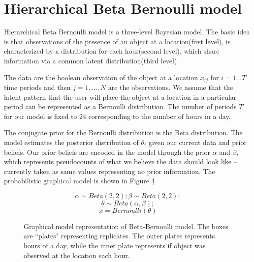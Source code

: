 \section{Hierarchical Beta Bernoulli model}


Hierarchical Beta Bernoulli model is a three-level Bayesian model. The basic idea is that observations of the presence of an object at a location(first level), is characterized by a distribution for each hour(second level), which share information via a common latent distribution(third level).

The data are the boolean observation of the object at a location $x_{ij}$ for $i = 1 \dots T$ time periods and then $j = 1, \dots , N$  are the observations.  We assume that the latent pattern that the user will place the object at a  location in a particular period can be represented as a Bernoulli distribution. The number of periods $T$ for our model is fixed to 24 corresponding to the number of hours in a day. 

The conjugate prior for the Bernoulli distribution is the Beta distribution. The model estimates the posterior distribution of $\theta_i$ given our current data and prior beliefs. Our prior beliefs are encoded in the model through the prior $\alpha$ and $\beta$, which represents pseudocounts of what we believe the data should look like – currently taken as same values representing no prior information. The probabilistic graphical model is shown in Figure \ref{bbm}

\noindent
\begin{figure}[htp]

\begin{minipage}{0.3\textwidth}
\centering


\end{minipage}%
\begin{minipage}{0.7\textwidth}

\begin{equation*}
	\alpha \sim Beta(2,2) ; \beta \sim Beta(2, 2);
\end{equation*}
\begin{equation*}
	\theta \sim Beta(\alpha, \beta);
\end{equation*}
\begin{equation*}
	x = Bernoulli(\theta)
\end{equation*}
\end{minipage}
\caption[Beta-Bernoulli graphical model]{Graphical model representation of Beta-Bernoulli model. The boxes are ``plates" representing replicates. The outer plates represents hours of a day, while the inner plate represents if object was observed at the location each hour.}
\label{bbm}
\end{figure}

